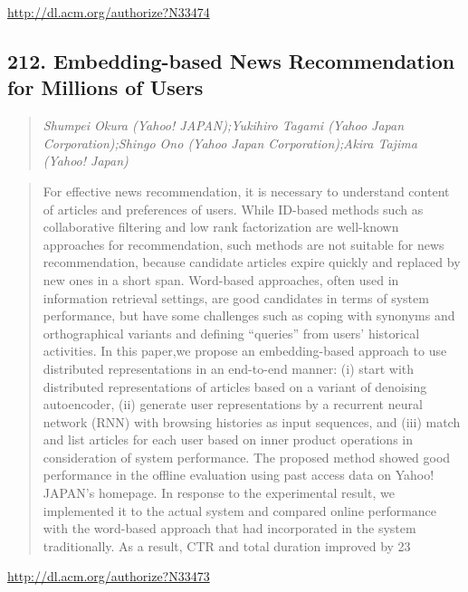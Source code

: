 \documentclass{article}
\begin{document}
\href{http://dl.acm.org/authorize?N33474}{http://dl.acm.org/authorize?N33474}

\subsection{212. Embedding-based News Recommendation for Millions of Users}

\begin{quote}
\footnotesize{\textit{Shumpei Okura (Yahoo! JAPAN);Yukihiro Tagami (Yahoo Japan Corporation);Shingo Ono (Yahoo Japan Corporation);Akira Tajima (Yahoo! Japan)}}

\end{quote}

\begin{quote}
For effective news recommendation, it is necessary to understand content of articles and preferences of users. While ID-based methods such as collaborative filtering and low rank factorization are well-known approaches for recommendation, such methods are not suitable for news recommendation, because candidate articles expire quickly and replaced by new ones in a short span. Word-based approaches, often used in information retrieval settings, are good candidates in terms of system performance, but have some challenges such as coping with synonyms and orthographical variants and defining “queries” from users’ historical activities. In this paper,we propose an embedding-based approach to use distributed representations in an end-to-end manner: (i) start with distributed representations of articles based on a variant of denoising autoencoder, (ii) generate user representations by a recurrent neural network (RNN) with browsing histories as input sequences, and (iii) match and list articles for each user based on inner product operations in consideration of system performance. The proposed method showed good performance in the offline evaluation using past access data on Yahoo! JAPAN’s homepage. In response to the experimental result, we implemented it to the actual system and compared online performance with the word-based approach that had incorporated in the system traditionally. As a result, CTR and total duration improved by 23 %
\end{quote}

\href{http://dl.acm.org/authorize?N33473}{http://dl.acm.org/authorize?N33473}
\end{document}
